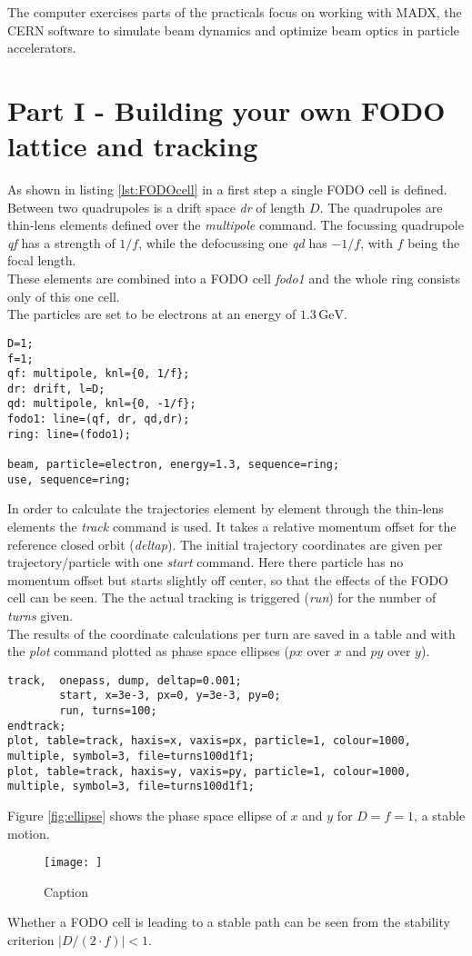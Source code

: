 The computer exercises parts of the practicals focus on working with MADX, the CERN software to simulate beam dynamics and optimize beam optics in particle accelerators.
\section{Part I - Building your own FODO lattice and tracking}
As shown in listing \ref{lst:FODOcell} in a first step a single FODO cell is defined. Between two quadrupoles is a drift space \textit{dr} of length $D$. The quadrupoles are thin-lens elements defined over the \textit{multipole} command. The focussing quadrupole \textit{qf} has a strength of $1/f$, while the defocussing one \textit{qd} has $-1/f$, with $f$ being the focal length.\\
These elements are combined into a FODO cell \textit{fodo1} and the whole ring consists only of this one cell.\\
The particles are set to be electrons at an energy of $1.3\mathrm{\,GeV}$.

\begin{lstlisting}[caption=Defining the FODO cell,label={lst:FODOcell}]
D=1;
f=1;
qf: multipole, knl={0, 1/f};
dr: drift, l=D;
qd: multipole, knl={0, -1/f};
fodo1: line=(qf, dr, qd,dr);
ring: line=(fodo1);

beam, particle=electron, energy=1.3, sequence=ring;
use, sequence=ring;
\end{lstlisting}

In order to calculate the trajectories element by element through the thin-lens elements the \textit{track} command is used. It takes a relative momentum offset for the reference closed orbit (\textit{deltap}). The initial trajectory coordinates are given per trajectory/particle with one \textit{start} command. Here there particle has no momentum offset but starts slightly off center, so that the effects of the FODO cell can be seen.
The the actual tracking is triggered (\textit{run}) for the number of \textit{turns} given.\\
The results of the coordinate calculations per turn are saved in a table and with the \textit{plot} command plotted as phase space ellipses ($px$ over $x$ and $py$ over $y$).

\begin{lstlisting}[caption=Tracking,label={lst:tracking}]
track,  onepass, dump, deltap=0.001;
        start, x=3e-3, px=0, y=3e-3, py=0;
        run, turns=100;
endtrack;
plot, table=track, haxis=x, vaxis=px, particle=1, colour=1000, multiple, symbol=3, file=turns100d1f1;
plot, table=track, haxis=y, vaxis=py, particle=1, colour=1000, multiple, symbol=3, file=turns100d1f1;
\end{lstlisting}
Figure \ref{fig:ellipse} shows the phase space ellipse of $x$ and $y$ for $D=f=1$, a stable motion.
\begin{figure}
    \centering
    \texttt{[image: ]}
    \caption{Caption}
    \label{fig:my_label}
\end{figure}

Whether a FODO cell is leading to a stable path can be seen from the stability criterion $|D/(2\cdot f)|<1$.
